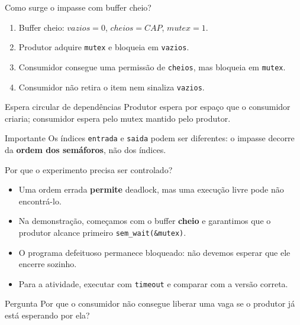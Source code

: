 \documentclass[aspectratio=169,11pt]{beamer}
\begin{document}
\begin{frame}{Como surge o impasse com buffer cheio?}
\small
\begin{enumerate}
\item Buffer cheio: \(vazios=0\), \(cheios=CAP\), \(mutex=1\).
\item Produtor adquire \texttt{mutex} e bloqueia em \texttt{vazios}.
\item Consumidor consegue uma permissão de \texttt{cheios}, mas bloqueia em \texttt{mutex}.
\item Consumidor não retira o item nem sinaliza \texttt{vazios}.
\end{enumerate}
\begin{alertblock}{Espera circular de dependências}
Produtor espera por espaço que o consumidor criaria; consumidor espera pelo mutex mantido pelo produtor.
\end{alertblock}
\begin{block}{Importante}
Os índices \texttt{entrada} e \texttt{saida} podem ser diferentes: o impasse decorre da \textbf{ordem dos semáforos}, não dos índices.
\end{block}
\end{frame}

\begin{frame}{Por que o experimento precisa ser controlado?}
\small
\begin{itemize}
\item Uma ordem errada \textbf{permite} deadlock, mas uma execução livre pode não encontrá-lo.
\item Na demonstração, começamos com o buffer \textbf{cheio} e garantimos que o produtor alcance primeiro \texttt{sem\_wait(\&mutex)}.
\item O programa defeituoso permanece bloqueado: não devemos esperar que ele encerre sozinho.
\item Para a atividade, executar com \texttt{timeout} e comparar com a versão correta.
\end{itemize}
\begin{block}{Pergunta}
Por que o consumidor não consegue liberar uma vaga se o produtor já está esperando por ela?
\end{block}
\end{frame}
\end{document}
